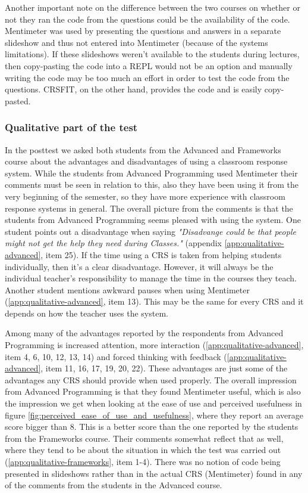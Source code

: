 Another important note on the difference between the two courses on whether or not they ran the code from the questions could be the availability of the code. Mentimeter was used by presenting the questions and answers in a separate slideshow and thus not entered into Mentimeter (because of the systems limitations). If these slideshows weren't available to the students during lectures, then copy-pasting the code into a REPL would not be an option and manually writing the code may be too much an effort in order to test the code from the questions. CRSFIT, on the other hand, provides the code and is easily copy-pasted.


\subsubsection*{Qualitative part of the test}
In the posttest we asked both students from the Advanced and Frameworks course about the advantages and disadvantages of using a classroom response system. While the students from Advanced Programming used Mentimeter their comments must be seen in relation to this, also they have been using it from the very beginning of the semester, so they have more experience with classroom response systems in general. The overall picture from the comments is that the students from Advanced Programming seems pleased with using the system. One student points out a disadvantage when saying \emph{"Disadvange could be that people might not get the help they need during Classes."} (appendix \ref{app:qualitative-advanced}, item 25). If the time using a CRS is taken from helping students individually, then it's a clear disadvantage. However, it will always be the individual teacher's responsibility to manage the time in the courses they teach. Another student mentions awkward pauses when using Mentimeter (\ref{app:qualitative-advanced}, item 13). This may be the same for every CRS and it depends on how the teacher uses the system.

Among many of the advantages reported by the respondents from Advanced Programming is increased attention, more interaction (\ref{app:qualitative-advanced}, item 4, 6, 10, 12, 13, 14) and forced thinking with feedback (\ref{app:qualitative-advanced}, item 11, 16, 17, 19, 20, 22). These advantages are just some of the advantages any CRS should provide when used properly. The overall impression from Advanced Programming is that they found Mentimeter useful, which is also the impression we get when looking at the ease of use and perceived usefulness in figure \ref{fig:perceived_ease_of_use_and_usefulness}, where they report an average score bigger than 8. This is a better score than the one reported by the students from the Frameworks course. Their comments somewhat reflect that as well, where they tend to be about the situation in which the test was carried out (\ref{app:qualitative-frameworks}, item 1-4). There was no notion of code being presented in slideshows rather than in the actual CRS (Mentimeter) found in any of the comments from the students in the Advanced course.

